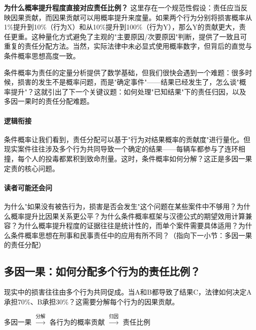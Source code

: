 \documentclass[../main.tex]{subfiles}
\begin{document}
	\textbf{为什么概率提升程度直接对应责任比例？} 这里存在一个规范性假设：责任应当反映因果贡献，而因果贡献可以用概率提升来度量。如果两个行为分别将损害概率从1\%提升到10\%（行为X）和从10\%提升到100\%（行为Y），那么Y的贡献更大，责任更重。这种量化方式避免了主观的"主要原因/次要原因"判断，提供了一致且可重复的责任分配方法。当然，实际法律中未必显式使用概率数字，但背后的直觉与条件概率思想高度一致。
	
	条件概率为责任的定量分析提供了数学基础，但我们很快会遇到一个难题：很多时候，损害的发生不是概率问题，而是"确定事件"——结果已经发生了，怎么谈"概率提升"？这就引出了下一个关键议题：如何处理"已知结果"下的责任归因，以及多因一果时的责任分配难题。
	
	\paragraph*{逻辑衔接}

	条件概率让我们看到，责任分配可以基于"行为对结果概率的贡献度"进行量化。但现实案件往往涉及多个行为共同导致一个确定的结果——每辆车都参与了连环相撞，每个人的投毒都累积到致命剂量。这时，条件概率如何分解？这正是多因一果定责的核心问题。
	
	\paragraph*{读者可能还会问}

	为什么"如果没有被告行为，损害是否会发生"这个问题在某些案件中不够用？为什么概率提升比因果关系更公平？为什么条件概率框架与汉德公式的期望效用计算兼容？为什么概率提升程度的证据往往是统计性的，而单个案件需要具体适用？为什么条件概率思想在刑事和民事责任中的应用有所不同？（指向下一小节：多因一果的责任分配）

	\subsection{多因一果：如何分配多个行为的责任比例？}

	\begin{motivation}

		现实中的损害往往由多个行为共同促成。当A和B都导致了结果C，法律如何决定A承担70\%、B承担30\%？这需要分解每个行为的因果贡献。

	\end{motivation}
	
	\begin{logicmap}

		多因一果 $\xrightarrow{\text{分解}}$ 各行为的概率贡献 $\xrightarrow{\text{归因}}$ 责任比例

	\end{logicmap}
	
\end{document}
